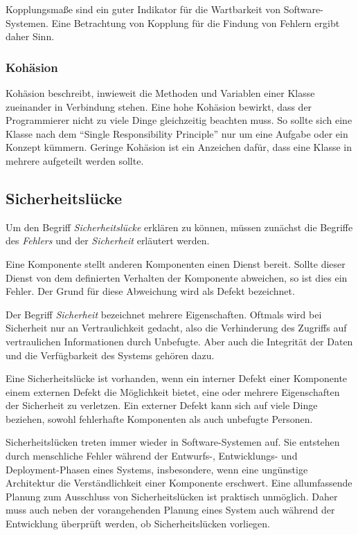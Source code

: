 Kopplungsmaße sind ein guter Indikator für die Wartbarkeit von Software-Systemen.
Eine Betrachtung von Kopplung für die Findung von Fehlern ergibt daher Sinn.

\subsubsection{Kohäsion}
Kohäsion beschreibt, inwieweit die Methoden und Variablen einer Klasse zueinander in Verbindung stehen.
Eine hohe Kohäsion bewirkt, dass der Programmierer nicht zu viele Dinge gleichzeitig beachten muss.
So sollte sich eine Klasse nach dem "`Single Responsibility Principle"' nur um eine Aufgabe oder ein Konzept kümmern.
Geringe Kohäsion ist ein Anzeichen dafür, dass eine Klasse in mehrere aufgeteilt werden sollte.

\subsection{Sicherheitslücke}
Um den Begriff \emph{Sicherheitslücke} erklären zu können, müssen zunächst die Begriffe des \emph{Fehlers} und der \emph{Sicherheit} erläutert werden.

Eine Komponente stellt anderen Komponenten einen Dienst bereit.
Sollte dieser Dienst von dem definierten Verhalten der Komponente abweichen, so ist dies ein Fehler.
Der Grund für diese Abweichung wird als Defekt bezeichnet.

Der Begriff \emph{Sicherheit} bezeichnet mehrere Eigenschaften.
Oftmals wird bei Sicherheit nur an Vertraulichkeit gedacht, also die Verhinderung des Zugriffs auf vertraulichen Informationen durch Unbefugte.
Aber auch die Integrität der Daten und die Verfügbarkeit des Systems gehören dazu.

Eine Sicherheitslücke ist vorhanden, wenn ein interner Defekt einer Komponente einem externen Defekt die Möglichkeit bietet, eine oder mehrere Eigenschaften der Sicherheit zu verletzen.
Ein externer Defekt kann sich auf viele Dinge beziehen, sowohl fehlerhafte Komponenten als auch unbefugte Personen.

Sicherheitslücken treten immer wieder in Software-Systemen auf.
Sie entstehen durch menschliche Fehler während der Entwurfs-, Entwicklungs- und Deployment-Phasen eines Systems, insbesondere, wenn eine ungünstige Architektur die Verständlichkeit einer Komponente erschwert.
Eine allumfassende Planung zum Ausschluss von Sicherheitslücken ist praktisch unmöglich.
Daher muss auch neben der vorangehenden Planung eines System auch während der Entwicklung überprüft werden, ob Sicherheitslücken vorliegen.
